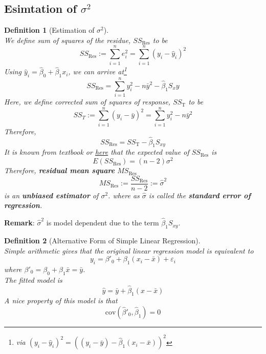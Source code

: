 \documentclass[12pt]{article}
\newcommand{\cov}{\mathrm{cov}}
\newtheorem{definition}{Definition}[section]
\theoremstyle{definition}
\begin{document}
\subsection{Esimtation of {$\sigma^2$}}
\begin{definition}[Estimation of {$\sigma^2$}]
\hfill\\\normalfont We define sum of squares of the residue, $SS_\text{Res}$ to be
\[
SS_\text{Res} := \sum_{i=1}^n e_i^2 = \sum_{i=1}^n (y_i-\hat{y}_i)^2
\]
Using $\hat{y}_i = \hat{\beta}_0 + \hat{\beta}_1 x_i$, we can arrive at\footnote{via $(y_i-\hat{y}_i)^2 = ((y_i-\bar{y}) - \hat{\beta}_1(x_i-\bar{x}))^2$}
\[
SS_\text{Res} = \sum_{i=1}^n y_i^2 - n\bar{y}^2-\hat{\beta}_1 S_xy
\]
Here, we define corrected sum of squares of response, $SS_\text{T}$ to be
\[
SS_T := \sum_{i=1}^n (y_i-\bar{y})^2 = \sum_{i=1}^n y_i^2 -n\bar{y}^2
\]
Therefore,
\[
SS_\text{Res} = SS_\text{T} -\hat{\beta}_1S_{xy}
\]
It is known \textit{from textbook} or \href{http://www.mas.ncl.ac.uk/~nag48/teaching/MAS2305/cribsheet2.pdf}{here} that the expected value of $SS_\text{Res}$ is
\[
E(SS_\text{Res}) = (n-2)\sigma^2
\]
Therefore, \textbf{residual mean square} $MS_\text{Res}$ 
\[
MS_\text{Res}:=\frac{SS_\text{Res}}{n-2}:=\hat{\sigma}^2
\]
is an \textbf{unbiased estimator} of $\sigma^2$. where as $\hat{\sigma}$ is called the \textbf{standard error of regression}.
\end{definition}
\textbf{Remark}: $\hat{\sigma}^2$ is model dependent due to the term $\hat{\beta}_1 S_{xy}$.
\begin{definition}[Alternative Form of Simple Linear Regression]
\hfill\\\normalfont Simple arithmetic gives that the original linear regression model is equivalent to
\[
y_i = \beta'_0+\beta_1(x_i-\bar{x})+\varepsilon_i
\]
where $\beta'_0 = \beta_0+\beta_1\bar{x} = \bar{y}$.\\
The fitted model is
\[
\hat{y} = \bar{y}+\hat{\beta}_1(x-\bar{x})
\]
A nice property of this model is that 
\[
\cov(\hat{\beta}'_0, \hat{\beta}_1) = 0
\]
\end{definition}
\end{document}
